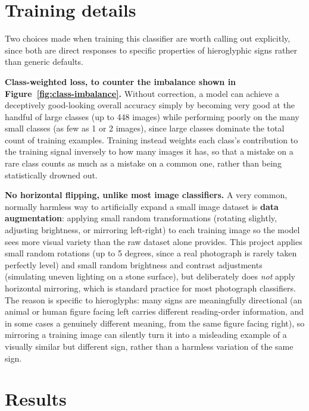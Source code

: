 \documentclass[11pt,a4paper]{report}
\begin{document}
\section{Training details}
\label{sec:training-details}

Two choices made when training this classifier are worth calling out
explicitly, since both are direct responses to specific properties of
hieroglyphic signs rather than generic defaults.

\textbf{Class-weighted loss, to counter the imbalance shown in
Figure~\ref{fig:class-imbalance}.} Without correction, a model can achieve a
deceptively good-looking overall accuracy simply by becoming very good at
the handful of large classes (up to 448 images) while performing poorly on
the many small classes (as few as 1 or 2 images), since large classes
dominate the total count of training examples. Training instead weights
each class's contribution to the training signal inversely to how many
images it has, so that a mistake on a rare class counts as much as a
mistake on a common one, rather than being statistically drowned out.

\textbf{No horizontal flipping, unlike most image classifiers.} A very
common, normally harmless way to artificially expand a small image dataset
is \textbf{data augmentation}: applying small random transformations
(rotating slightly, adjusting brightness, or mirroring left-right) to each
training image so the model sees more visual variety than the raw dataset
alone provides. This project applies small random rotations (up to 5
degrees, since a real photograph is rarely taken perfectly level) and small
random brightness and contrast adjustments (simulating uneven lighting on a
stone surface), but deliberately does \emph{not} apply horizontal
mirroring, which is standard practice for most photograph classifiers. The
reason is specific to hieroglyphs: many signs are meaningfully directional
(an animal or human figure facing left carries different reading-order
information, and in some cases a genuinely different meaning, from the same
figure facing right), so mirroring a training image can silently turn it
into a misleading example of a visually similar but different sign, rather
than a harmless variation of the same sign.

\section{Results}
\label{sec:classifier-results}
\end{document}
